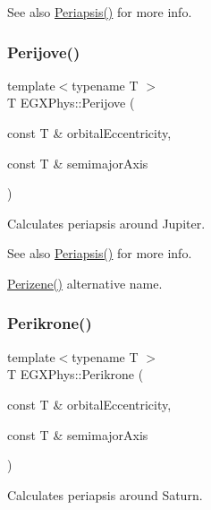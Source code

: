 \begin{DoxySeeAlso}{See also}
\hyperlink{group___periapsis_ga4414ac75539371ec874a3d25cad6c9fe}{Periapsis()} for more info. 
\end{DoxySeeAlso}
\mbox{\label{group___periapsis_ga075052f7ff9aa1d5fdf4501b493be86b}} 
\subsubsection{\texorpdfstring{Perijove()}{Perijove()}}
{\footnotesize\ttfamily template$<$typename T $>$ \\
T E\+G\+X\+Phys\+::\+Perijove (\begin{DoxyParamCaption}\item[{const T \&}]{orbital\+Eccentricity,  }\item[{const T \&}]{semimajor\+Axis }\end{DoxyParamCaption})}



Calculates periapsis around Jupiter. 

\begin{DoxySeeAlso}{See also}
\hyperlink{group___periapsis_ga4414ac75539371ec874a3d25cad6c9fe}{Periapsis()} for more info. 

\hyperlink{group___periapsis_ga0523c65b7fc26e675388b2c3d38aa00b}{Perizene()} alternative name. 
\end{DoxySeeAlso}
\mbox{\label{group___periapsis_gaa56f74c44a3583b8f0d13b821c1d7422}} 
\subsubsection{\texorpdfstring{Perikrone()}{Perikrone()}}
{\footnotesize\ttfamily template$<$typename T $>$ \\
T E\+G\+X\+Phys\+::\+Perikrone (\begin{DoxyParamCaption}\item[{const T \&}]{orbital\+Eccentricity,  }\item[{const T \&}]{semimajor\+Axis }\end{DoxyParamCaption})}



Calculates periapsis around Saturn. 

